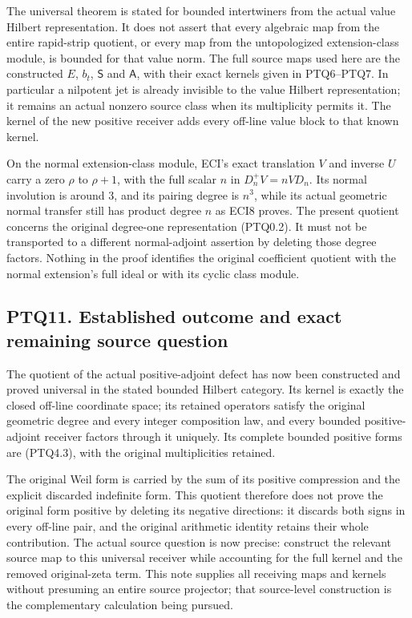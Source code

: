 The universal theorem is stated for bounded intertwiners from the actual
value Hilbert representation. It does not assert that every algebraic
map from the entire rapid-strip quotient, or every map from the
untopologized extension-class module, is bounded for that value norm.
The full source maps used here are the constructed \(E\), \(b_t\),
\(\mathsf S\) and \(\mathsf A\), with their exact kernels given in
PTQ6--PTQ7. In particular a nilpotent jet is already invisible to the
value Hilbert representation; it remains an actual nonzero source class
when its multiplicity permits it. The kernel of the new positive
receiver adds every off-line value block to that known kernel.

On the normal extension-class module, ECI's exact translation \(V\) and
inverse \(U\) carry a zero \(\rho\) to \(\rho+1\), with the full scalar
\(n\) in \(D_n^+V=nVD_n\). Its normal involution is around \(3\), and
its pairing degree is \(n^3\), while its actual geometric normal
transfer still has product degree \(n\) as ECI8 proves. The present
quotient concerns the original degree-one representation (PTQ0.2). It
must not be transported to a different normal-adjoint assertion by
deleting those degree factors. Nothing in the proof identifies the
original coefficient quotient with the normal extension's full ideal or
with its cyclic class module.

\subsection{PTQ11. Established outcome and exact remaining source
question}\label{ptq11.-established-outcome-and-exact-remaining-source-question}

The quotient of the actual positive-adjoint defect has now been
constructed and proved universal in the stated bounded Hilbert category.
Its kernel is exactly the closed off-line coordinate space; its retained
operators satisfy the original geometric degree and every integer
composition law, and every bounded positive-adjoint receiver factors
through it uniquely. Its complete bounded positive forms are (PTQ4.3),
with the original multiplicities retained.

The original Weil form is carried by the sum of its positive compression
and the explicit discarded indefinite form. This quotient therefore does
not prove the original form positive by deleting its negative
directions: it discards both signs in every off-line pair, and the
original arithmetic identity retains their whole contribution. The
actual source question is now precise: construct the relevant source map
to this universal receiver while accounting for the full kernel and the
removed original-zeta term. This note supplies all receiving maps and
kernels without presuming an entire source projector; that source-level
construction is the complementary calculation being pursued.

